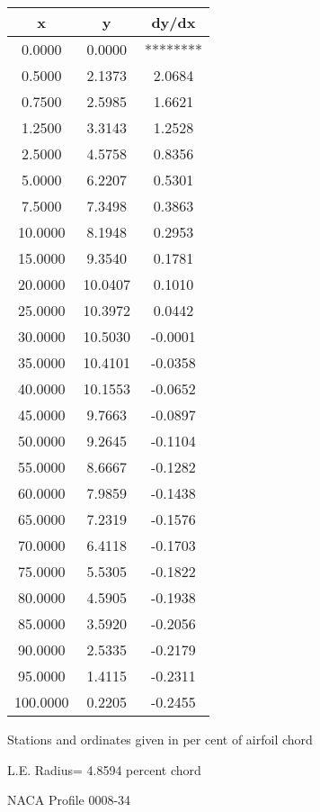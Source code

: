 \documentclass[11pt]{book}
\begin{document}
 \vspace{8mm}
 \begin{tabular}{|c|c|c|} \hline 
  x  &  y  &  dy/dx \\
 \hline
0.0000 & 0.0000 & ******** \\
0.5000 & 2.1373 & 2.0684 \\
0.7500 & 2.5985 & 1.6621 \\
1.2500 & 3.3143 & 1.2528 \\
2.5000 & 4.5758 & 0.8356 \\
5.0000 & 6.2207 & 0.5301 \\
7.5000 & 7.3498 & 0.3863 \\
10.0000 & 8.1948 & 0.2953 \\
15.0000 & 9.3540 & 0.1781 \\
20.0000 & 10.0407 & 0.1010 \\
25.0000 & 10.3972 & 0.0442 \\
30.0000 & 10.5030 & -0.0001 \\
35.0000 & 10.4101 & -0.0358 \\
40.0000 & 10.1553 & -0.0652 \\
45.0000 & 9.7663 & -0.0897 \\
50.0000 & 9.2645 & -0.1104 \\
55.0000 & 8.6667 & -0.1282 \\
60.0000 & 7.9859 & -0.1438 \\
65.0000 & 7.2319 & -0.1576 \\
70.0000 & 6.4118 & -0.1703 \\
75.0000 & 5.5305 & -0.1822 \\
80.0000 & 4.5905 & -0.1938 \\
85.0000 & 3.5920 & -0.2056 \\
90.0000 & 2.5335 & -0.2179 \\
95.0000 & 1.4115 & -0.2311 \\
100.0000 & 0.2205 & -0.2455 \\
 \hline
 \end{tabular}
 \vspace{8mm}


Stations and ordinates given in per cent of airfoil chord 


L.E. Radius=  4.8594 percent chord
 \newpage
  \label{p0008-34}
 \begin{Large}
 NACA Profile 0008-34
 \end{Large}
  
\end{document}
